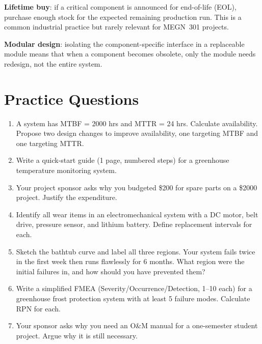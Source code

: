 \documentclass[11pt,letterpaper,twoside,openany]{book}
\begin{document}
\textbf{Lifetime buy}: if a critical component is announced for end-of-life (EOL), purchase enough stock for the expected remaining production run. This is a common industrial practice but rarely relevant for MEGN~301 projects.

\textbf{Modular design}: isolating the component-specific interface in a replaceable module means that when a component becomes obsolete, only the module needs redesign, not the entire system.
\section{Practice Questions}
\begin{enumerate}[leftmargin=1.5em]
\item A system has MTBF = 2000 hrs and MTTR = 24 hrs. Calculate availability. Propose two design changes to improve availability, one targeting MTBF and one targeting MTTR.
\item Write a quick-start guide (1 page, numbered steps) for a greenhouse temperature monitoring system.
\item Your project sponsor asks why you budgeted \$200 for spare parts on a \$2000 project. Justify the expenditure.
\item Identify all wear items in an electromechanical system with a DC motor, belt drive, pressure sensor, and lithium battery. Define replacement intervals for each.
\item Sketch the bathtub curve and label all three regions. Your system fails twice in the first week then runs flawlessly for 6 months. What region were the initial failures in, and how should you have prevented them?
\item Write a simplified FMEA (Severity/Occurrence/Detection, 1--10 each) for a greenhouse frost protection system with at least 5 failure modes. Calculate RPN for each.
\item Your sponsor asks why you need an O\&M manual for a one-semester student project. Argue why it is still necessary.
\end{enumerate}
\end{document}

